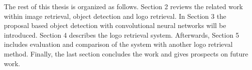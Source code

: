 The rest of this thesis is organized as follows. Section 2 reviews the related work within image retrieval, object detection and logo retrieval. In Section 3 the proposal based object detection with convolutional neural networks will be introduced. Section 4 describes the logo retrieval system. Afterwards, Section 5 includes evaluation and comparison of the system with another logo retrieval method. Finally, the last section concludes the work and gives prospects on future work.